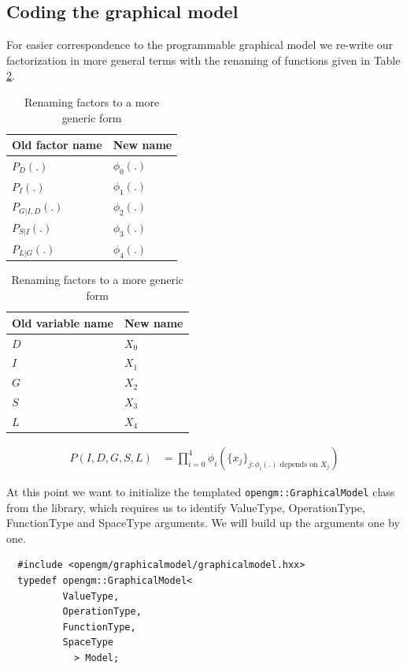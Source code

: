 \documentclass[12pt,oneside,letterpaper]{article}
\begin{document}
\subsection{Coding the graphical model}

For easier correspondence to the programmable graphical model we re-write our 
factorization in more general terms with the renaming of functions given in Table \ref{tab:rename}.
\begin{table}
  \centering
  \begin{tabular}{|l|l|}
    \hline
    Old factor name & New name \\
    \hline
          $P_D(.)$  & $\phi_0(.)$\\
          $P_I(.)$  & $\phi_1(.)$\\
    $P_{G|I,D}(.)$  & $\phi_2(.)$\\
      $P_{S|I}(.)$  & $\phi_3(.)$\\
      $P_{L|G}(.)$  & $\phi_4(.)$\\
    \hline
  \end{tabular}
  \begin{tabular}{|l|l|}
    \hline
    Old variable name & New name \\
    \hline
                  $D$ & $X_0$\\
                  $I$ & $X_1$\\
                  $G$ & $X_2$\\
                  $S$ & $X_3$\\
                  $L$ & $X_4$ \\
    \hline
  \end{tabular}
  \caption{Renaming factors to a more generic form}
  \label{tab:rename}
\end{table}

\begin{align}
  P(I, D, G, S, L) &= \prod_{i=0}^{4} \phi_i(\{ x_j \}_{j : \phi_i(.) \text{ depends on } X_j})
  \label{eq:factorization}
\end{align}

At this point we want to initialize the templated
\lstinline|opengm::GraphicalModel| class from the library, which requires us to
identify ValueType, OperationType, FunctionType and SpaceType arguments. We
will build up the arguments one by one.

\begin{lstlisting}
  #include <opengm/graphicalmodel/graphicalmodel.hxx>
  typedef opengm::GraphicalModel<
          ValueType,
          OperationType,
          FunctionType,
          SpaceType
            > Model;
\end{lstlisting}
\end{document}
